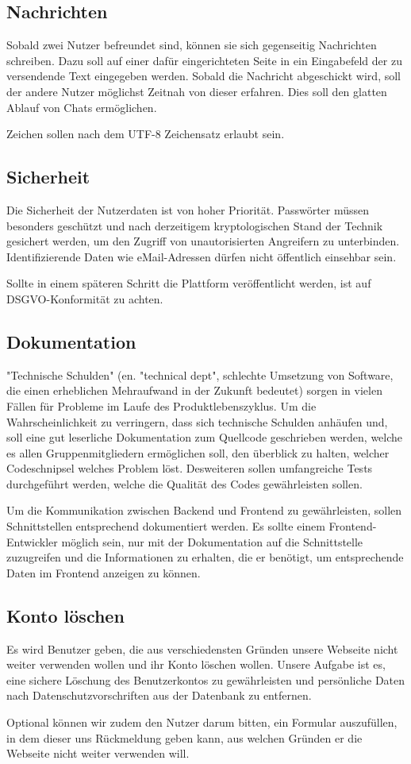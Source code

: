 \subsection{Nachrichten}
Sobald zwei Nutzer befreundet sind, können sie sich gegenseitig Nachrichten schreiben. Dazu soll auf einer dafür eingerichteten Seite in ein Eingabefeld der zu versendende Text eingegeben werden. Sobald die Nachricht abgeschickt wird, soll der andere Nutzer möglichst Zeitnah von dieser erfahren. Dies soll den glatten Ablauf von Chats ermöglichen.

Zeichen sollen nach dem UTF-8 Zeichensatz erlaubt sein.

\subsection{Sicherheit}
Die Sicherheit der Nutzerdaten ist von hoher Priorität. Passwörter müssen besonders geschützt und nach derzeitigem kryptologischen Stand der Technik gesichert werden, um den Zugriff von unautorisierten Angreifern zu unterbinden. Identifizierende Daten wie eMail-Adressen dürfen nicht öffentlich einsehbar sein.

Sollte in einem späteren Schritt die Plattform veröffentlicht werden, ist auf DSGVO-Konformität zu achten.

\subsection{Dokumentation}
"Technische Schulden" (en. "technical dept", schlechte Umsetzung von Software, die einen erheblichen Mehraufwand in der Zukunft bedeutet) sorgen in vielen Fällen für Probleme im Laufe des Produktlebenszyklus. Um die Wahrscheinlichkeit zu verringern, dass sich technische Schulden anhäufen und, soll eine gut leserliche Dokumentation zum Quellcode geschrieben werden, welche es allen Gruppenmitgliedern ermöglichen soll, den überblick zu halten, welcher Codeschnipsel welches Problem löst. Desweiteren sollen umfangreiche Tests durchgeführt werden, welche die Qualität des Codes gewährleisten sollen.

Um die Kommunikation zwischen Backend und Frontend zu gewährleisten, sollen Schnittstellen entsprechend dokumentiert werden. Es sollte einem Frontend-Entwickler möglich sein, nur mit der Dokumentation auf die Schnittstelle zuzugreifen und die Informationen zu erhalten, die er benötigt, um entsprechende Daten im Frontend anzeigen zu können.

\subsection{Konto löschen}
Es wird Benutzer geben, die aus verschiedensten Gründen unsere Webseite nicht weiter verwenden wollen und ihr Konto löschen wollen. Unsere Aufgabe ist es, eine sichere Löschung des Benutzerkontos zu gewährleisten und persönliche Daten nach Datenschutzvorschriften aus der Datenbank zu entfernen.

Optional können wir zudem den Nutzer darum bitten, ein Formular auszufüllen, in dem dieser uns Rückmeldung geben kann, aus welchen Gründen er die Webseite nicht weiter verwenden will.
